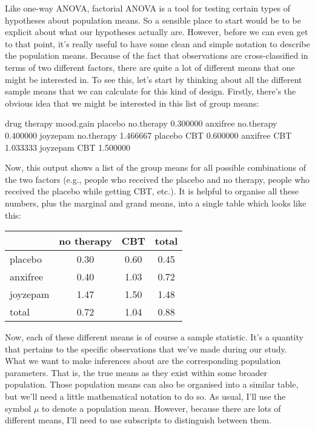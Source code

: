 
Like one-way ANOVA, factorial ANOVA is a tool for testing certain types of hypotheses about population means. So a sensible place to start would be to be explicit about what our hypotheses actually are. However, before we can even get to that point, it's really useful to have some clean and simple notation to describe the population means. Because of the fact that observations are cross-classified in terms of two different factors, there are quite a lot of different means that one might be interested in. To see this, let's start by thinking about all the different sample means that we can calculate for this kind of design. Firstly, there's the obvious idea that we might be interested in this list of group means:
\newpage
\begin{rblock1}
drug     therapy     mood.gain
placebo  no.therapy  0.300000
anxifree no.therapy  0.400000
joyzepam no.therapy  1.466667
placebo     CBT      0.600000
anxifree    CBT      1.033333
joyzepam    CBT      1.500000
\end{rblock1}
Now, this output shows a list of the group means for all possible combinations of the two factors (e.g., people who received the placebo and no therapy, people who received the placebo while getting CBT, etc.). It is helpful to organise all these numbers, plus the marginal and grand means, into a single table which looks like this:

\begin{center}
\begin{tabular}{l|cc|c}
& no therapy & CBT & total \\ \hline
placebo & 0.30 & 0.60 & 0.45 \\
anxifree & 0.40 & 1.03 & 0.72 \\
joyzepam & 1.47 & 1.50 & 1.48 \\ \hline
total & 0.72 & 1.04 & 0.88
\end{tabular}
\end{center}

Now, each of these different means is of course a sample statistic. It's a quantity that pertains to the specific observations that we've made during our study. What we want to make inferences about are the corresponding population parameters. That is, the true means as they exist within some broader population. Those population means can also be organised into a similar table, but we'll need a little mathematical notation to do so. As usual, I'll use the symbol $\mu$ to denote a population mean. However, because there are lots of different means, I'll need to use subscripts to distinguish between them. 

